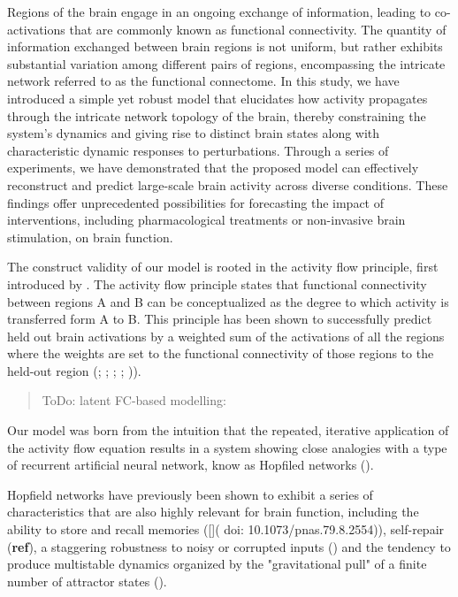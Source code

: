 \documentclass{article}
\begin{document}
Regions of the brain engage in an ongoing exchange of information, leading to co-activations that are commonly known as functional connectivity.
The quantity of information exchanged between brain regions is not uniform, but rather exhibits substantial variation among different pairs of regions, encompassing the intricate network referred to as the functional connectome.
In this study, we have introduced a simple yet robust model that elucidates how activity propagates through the intricate network topology of the brain, thereby constraining the system's dynamics and giving rise to distinct brain states along with characteristic dynamic responses to perturbations.
Through a series of experiments, we have demonstrated that the proposed model can effectively reconstruct and predict large-scale brain activity across diverse conditions. These findings offer unprecedented possibilities for forecasting the impact of interventions, including pharmacological treatments or non-invasive brain stimulation, on brain function.

The construct validity of our model is rooted in the activity flow principle, first introduced by \href{https://doi.org/10.1038/nn.4406}{}. The activity flow principle states that functional connectivity between regions A and B can be conceptualized as the degree to which activity is transferred form A to B. This principle has been shown to successfully predict held out brain activations by a weighted sum of the activations of all the regions where the weights are set to the functional connectivity of those regions to the held-out region (\href{https://doi.org/10.1038/nn.4406}{}; \cite{Ito_2017}; \href{https://doi.org/10.1371/journal.pbio.3001686}{}; \href{https://doi.org/10.1126/sciadv.abf2513}{}; \href{https://doi.org/10.1089/brain.2018.0586}{})).

\begin{quote}
ToDo: latent FC-based modelling: \href{https://doi.org/10.1162/netn\_a\_00234}{}
\end{quote}

Our model was born from the intuition that the repeated, iterative application of the activity flow equation results in a system showing close analogies with a type of recurrent artificial neural network, know as Hopfiled networks (\href{https://doi.org/10.1073/pnas.79.8.2554}{}).

Hopfield networks have previously been shown to exhibit a series of characteristics that are also highly relevant for brain function, including the ability to store and recall memories ([]( doi: 10.1073/pnas.79.8.2554)), self-repair (\textbf{ref}), a staggering robustness to noisy or corrupted inputs (\href{https://doi.org/10.1063/1.2810360}{}) and the tendency to produce multistable dynamics organized by the "gravitational pull" of a finite number of attractor states (\href{https://doi.org/10.1038/s41583-022-00642-0}{}).
\end{document}
